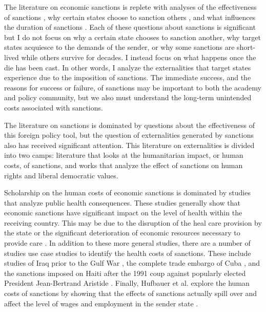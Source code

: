 \documentclass[a4paper]{article}\usepackage[]{graphicx}\usepackage[]{color}
\begin{document}
The literature on economic sanctions is replete with analyses of the effectiveness of sanctions \citep{lindsay1986trade, tsebelis1990sanctions, elliott1993effectiveness, smith1995success, dashti1997determinants, morgan1997fools, pape1997economic, elliott1998sanctions, drezner2000bargaining, marinov2005economic}, why certain states choose to sanction others \citep{nossal1989international, smith1995success, hart2000democracy, baldwin2006sanctions}, and what influences the duration of sanctions \citep{bolks2000long, dorussen2001ending, mcgillivray2004political}. Each of these questions about sanctions is significant but I do not focus on why a certain state chooses to sanction another, why target states acquiesce to the demands of the sender, or why some sanctions are short-lived while others survive for decades. I instead focus on what happens once the die has been cast. In other words, I analyze the externalities that target states experience due to the imposition of sanctions. The immediate success, and the reasons for success or failure, of sanctions may be important to both the academy and policy community, but we also must understand the long-term unintended costs associated with sanctions.
\par
The literature on sanctions is dominated by questions about the effectiveness of this foreign policy tool, but the question of externalities generated by sanctions also has received significant attention. This literature on externalities is divided into two camps: literature that looks at the humanitarian impact, or human costs, of sanctions, and works that analyze the effect of sanctions on human rights and liberal democratic values.
\par
Scholarship on the human costs of economic sanctions is dominated by studies that analyze public health consequences. These studies generally show that economic sanctions have significant impact on the level of health within the receiving country. This may be due to the disruption of the heal care provision by the state or the significant deterioration of economic resources necessary to provide care \citep{gibbons1999impact, garfield1995health, peksen2011economic}. In addition to these more general studies, there are a number of studies use case studies to identify the health costs of sanctions. These include studies of Iraq prior to the Gulf War \citep{garfield1999morbidity, ascherio1992effect}, the complete trade embargo of Cuba \citep{garfield1997impact, barry2000effect, kuntz1994politics}, and the sanctions imposed on Haiti after the 1991 coup against popularly elected President Jean-Bertrand Aristide \citep{gibbons1999impact}.  Finally, Hufbauer et al. explore the human costs of sanctions by showing that the effects of sanctions actually spill over and affect the level of wages and employment in the sender state \citep{hufbauer1997us}.  
\end{document}
